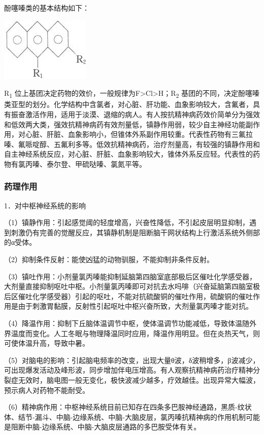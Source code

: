 酚噻嗪类的基本结构如下：
\begin{center}
\includegraphics[width=.3\textwidth]{./images/Image00015.jpg}
\end{center}
R\textsubscript{1}
位上基团决定药物的效价，一般规律为F\textgreater{}Cl\textgreater{}H；R\textsubscript{2}
基团的不同，决定酚噻嗪类亚型的划分。化学结构中含氯者，对心脏、肝功能、血象影响较大，含氟者，具有振奋激活作用，适用于淡漠、退缩的病人。有人按抗精神病药效价简单分为强效和低效两大类，强效抗精神病药有效剂量低，镇静作用弱，较少自主神经功能副作用，对心脏、肝脏、血象影响小，但锥体外系副作用较重。代表性药物有三氟拉嗪、氟哌啶醇、五氟利多等。低效抗精神病药，治疗剂量高，有较强的镇静作用和自主神经系统反应，对心脏、肝脏、血象影响较大，锥体外系反应轻。代表性的药物有氯丙嗪、泰尔登、甲硫哒嗪、氯氮平等。

\subsubsection{药理作用}

1．对中枢神经系统的影响

（1）镇静作用：引起感觉阈的轻度增高，兴奋性降低，不引起皮层明显抑制，遇到刺激仍有完善的觉醒反应，其镇静机制是阻断脑干网状结构上行激活系统外侧部的α受体。

（2）抑制条件反射：能使凶猛的动物驯服，不能抑制非条件反射。

（3）镇吐作用：小剂量氯丙嗪能抑制延脑第四脑室底部极后区催吐化学感受器，大剂量直接抑制呕吐中枢。小剂量氯丙嗪即可对抗去水吗啡（兴奋延脑第四脑室极后区催吐化学感受器）引起的呕吐，不能对抗硫酸铜的催吐作用，硫酸铜的催吐作用是由于刺激胃黏膜，反射性引起呕吐中枢兴奋所致，大剂量氯丙嗪才能对抗。

（4）降温作用：抑制下丘脑体温调节中枢，使体温调节功能减低，导致体温随外界温度而变化。人工冬眠与物理降温同时应用，降温作用明显。但在炎热天气，则可使体温升高，导致中暑。

（5）对脑电的影响：引起脑电频率的改变，出现大量θ波，δ波稍增多，β波减少，可出现爆发活动及峰形波，同步增加伴电压增高。有人观察抗精神病药治疗精神分裂症无效时，脑电图一般无变化，极快波减少越多，疗效越佳。出现异常大幅波，预示病人对药物不能耐受。

（6）精神病作用：中枢神经系统目前已知存在四条多巴胺神经通路，黑质-纹状体、结节-漏斗、中脑-边缘系统、中脑-大脑皮层，氯丙嗪抗精神病的作用机制可能是阻断中脑-边缘系统、中脑-大脑皮层通路的多巴胺受体有关。

